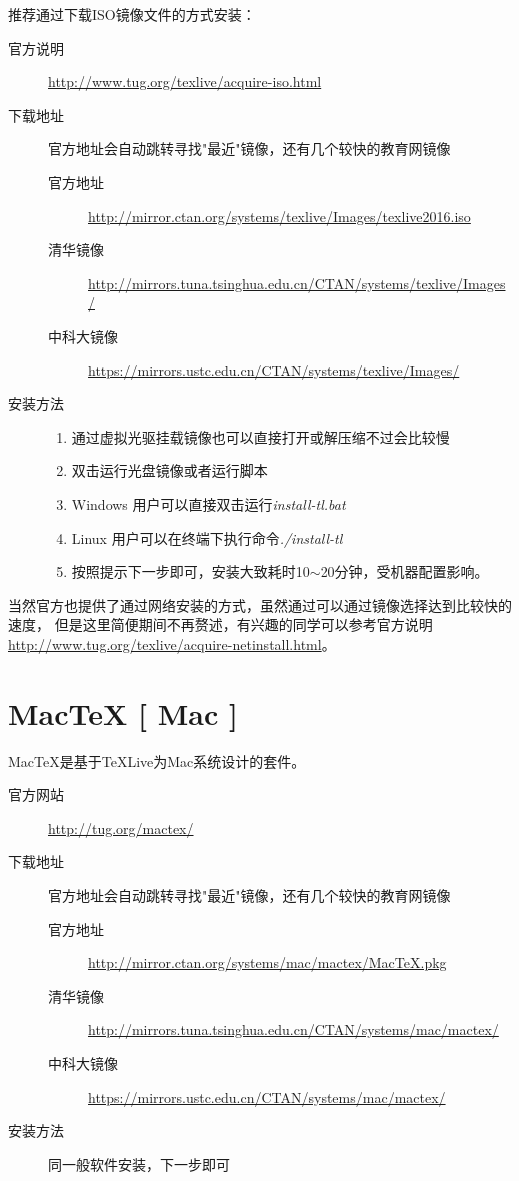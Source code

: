 推荐通过下载ISO镜像文件的方式安装：
\begin{description}
	\item[官方说明]
	\url{http://www.tug.org/texlive/acquire-iso.html}
	\item[下载地址] 官方地址会自动跳转寻找"最近"镜像，还有几个较快的教育网镜像
	\begin{description}
		\item[官方地址]
		\url{http://mirror.ctan.org/systems/texlive/Images/texlive2016.iso}
		\item[清华镜像]
		\url{http://mirrors.tuna.tsinghua.edu.cn/CTAN/systems/texlive/Images/}
		\item[中科大镜像]
		\url{https://mirrors.ustc.edu.cn/CTAN/systems/texlive/Images/}
	\end{description}
	\item[安装方法] \hfill
	\begin{enumerate}
		\item 通过虚拟光驱挂载镜像也可以直接打开或解压缩不过会比较慢
		\item 双击运行光盘镜像或者运行脚本
		\item[] Windows 用户可以直接双击运行\textsl{install-tl.bat}
		\item[] Linux 用户可以在终端下执行命令\textsl{./install-tl}
		\item 按照提示下一步即可，安装大致耗时10$\sim$20分钟，受机器配置影响。
	\end{enumerate}
\end{description}

当然官方也提供了通过网络安装的方式，虽然通过可以通过镜像选择达到比较快的速度，
但是这里简便期间不再赘述，有兴趣的同学可以参考官方说明
\url{http://www.tug.org/texlive/acquire-netinstall.html}。

\section{Mac\TeX{} [ Mac ]}

Mac\TeX{}是基于\TeX{}Live为Mac系统设计的套件。

\begin{description}
	\item[官方网站]
	\url{http://tug.org/mactex/}
	\item[下载地址] 官方地址会自动跳转寻找"最近"镜像，还有几个较快的教育网镜像
	\begin{description}
		\item[官方地址]
		\url{http://mirror.ctan.org/systems/mac/mactex/MacTeX.pkg}
		\item[清华镜像]
		\url{http://mirrors.tuna.tsinghua.edu.cn/CTAN/systems/mac/mactex/}
		\item[中科大镜像]
		\url{https://mirrors.ustc.edu.cn/CTAN/systems/mac/mactex/}
	\end{description}
	\item[安装方法] 同一般软件安装，下一步即可
\end{description}


